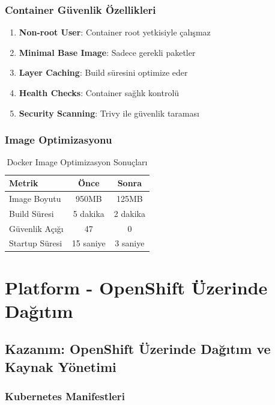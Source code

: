 \documentclass[12pt,a4paper]{article}
\begin{document}
\subsubsection{Container Güvenlik Özellikleri}

\begin{enumerate}
    \item \textbf{Non-root User}: Container root yetkisiyle çalışmaz
    \item \textbf{Minimal Base Image}: Sadece gerekli paketler
    \item \textbf{Layer Caching}: Build süresini optimize eder
    \item \textbf{Health Checks}: Container sağlık kontrolü
    \item \textbf{Security Scanning}: Trivy ile güvenlik taraması
\end{enumerate}

\subsubsection{Image Optimizasyonu}

\begin{table}[H]
\centering
\begin{tabular}{@{}lcc@{}}
\toprule
\textbf{Metrik} & \textbf{Önce} & \textbf{Sonra} \\
\midrule
Image Boyutu & 950MB & 125MB \\
Build Süresi & 5 dakika & 2 dakika \\
Güvenlik Açığı & 47 & 0 \\
Startup Süresi & 15 saniye & 3 saniye \\
\bottomrule
\end{tabular}
\caption{Docker Image Optimizasyon Sonuçları}
\end{table}

\section{Platform - OpenShift Üzerinde Dağıtım}

\subsection{Kazanım: OpenShift Üzerinde Dağıtım ve Kaynak Yönetimi}

\subsubsection{Kubernetes Manifestleri}
\end{document}
